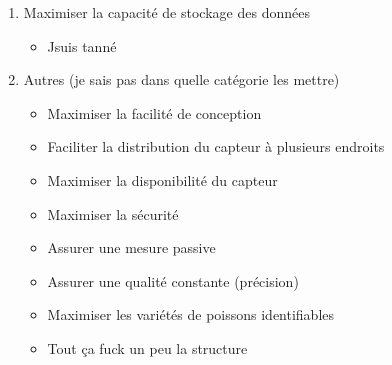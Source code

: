 \begin{enumerate}
    \item Maximiser la capacité de stockage des données
    \begin{itemize}
        \item Jsuis tanné
    \end{itemize}
    
    \item Autres (je sais pas dans quelle catégorie les mettre)
    \begin{itemize}
        \item Maximiser la facilité de conception
        \item Faciliter la distribution du capteur à plusieurs endroits
        \item Maximiser la disponibilité du capteur
        \item Maximiser la sécurité
        \item Assurer une mesure passive
        \item Assurer une qualité constante (précision)
        \item Maximiser les variétés de poissons identifiables
        \item Tout ça fuck un peu la structure
    \end{itemize}
    
\end{enumerate}

